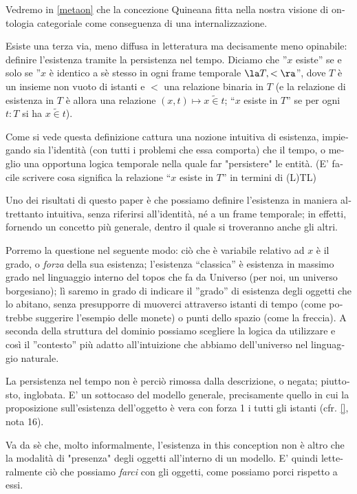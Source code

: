 \documentclass{amsart}
\begin{document}
\begin{italian}
 	Vedremo in \autoref{metaon} che la concezione Quineana fitta nella nostra visione di ontologia categoriale come conseguenza di una internalizzazione. 
 	
 	Esiste una terza via, meno diffusa in letteratura ma decisamente meno opinabile: definire l'esistenza tramite la persistenza nel tempo. Diciamo che ''$x$ esiste'' se e solo se ''$x$ è identico a sè stesso in ogni frame temporale $\la T,<\ra$'', dove $T$ è un insieme non vuoto di istanti e $<$ una relazione binaria in $T$ (e la relazione di esistenza in $T$ è allora una relazione $(x,t)\mapsto x\mathrel{\tilde\in} t$; ``$x$ esiste in $T$'' se per ogni $t : T$ si ha $x\mathrel{\tilde\in} t$).
 	
 	Come si vede questa definizione cattura una nozione intuitiva di esistenza, impiegando sia l'identità (con tutti i problemi che essa comporta) che il tempo, o meglio una opportuna logica temporale nella quale far "persistere" le entità. (E' facile scrivere cosa significa la relazione ``$x$ esiste in $T$'' in termini di (L)TL)
 	
	 Uno dei risultati di questo paper è che possiamo definire l'esistenza in maniera altrettanto intuitiva, senza riferirsi all'identità, né a un frame temporale; in effetti, fornendo un concetto più generale, dentro il quale si troveranno anche gli altri.
	 
	 Porremo la questione nel seguente modo: ciò che è variabile relativo ad $x$ è il grado, o \emph{forza} della sua esistenza; l'esistenza ``classica'' è esistenza in massimo grado nel linguaggio interno del topos che fa da Universo (per noi, un universo borgesiano); lì saremo in grado di indicare il ''grado'' di esistenza degli oggetti che lo abitano, senza presupporre di muoverci attraverso istanti di tempo (come potrebbe suggerire l'esempio delle monete) o punti dello spazio (come la freccia).%
	 A seconda della struttura del dominio possiamo scegliere la logica da utilizzare e così il ''contesto'' più adatto all'intuizione che abbiamo dell'universo nel linguaggio naturale. 
 	
 	La persistenza nel tempo non è perciò rimossa dalla descrizione, o negata; piuttosto, inglobata. E' un sottocaso del modello generale, precisamente quello in cui la proposizione sull'esistenza dell'oggetto è vera con forza 1 i tutti gli istanti (cfr. \autoref{}, nota 16).
 	
 	Va da sè che, molto informalmente, l'esistenza in this conception non è altro che la modalità di "presenza" degli oggetti all'interno di un modello. E' quindi letteralmente ciò che possiamo \emph{farci} con gli oggetti, come possiamo porci rispetto a essi. 
 	

\end{italian}
\end{document}
